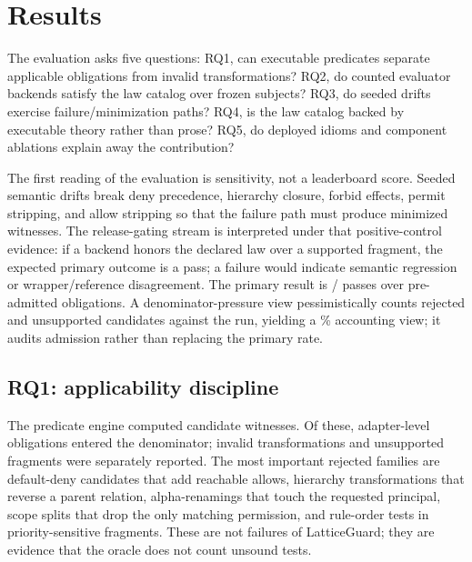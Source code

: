 \documentclass[10pt,conference]{IEEEtran}
\begin{document}
\section{Results}
\label{sec:evaluation}
The evaluation asks five questions: RQ1, can executable predicates separate applicable obligations from invalid transformations? RQ2, do counted evaluator backends satisfy the law catalog over frozen subjects? RQ3, do seeded drifts exercise failure/minimization paths? RQ4, is the law catalog backed by executable theory rather than prose? RQ5, do deployed idioms and component ablations explain away the contribution?

The first reading of the evaluation is sensitivity, not a leaderboard score.  Seeded semantic drifts break deny precedence, hierarchy closure, forbid effects, permit stripping, and allow stripping so that the failure path must produce minimized witnesses.  The release-gating stream is interpreted under that positive-control evidence: if a backend honors the declared law over a supported fragment, the expected primary outcome is a pass; a failure would indicate semantic regression or wrapper/reference disagreement.  The primary result is \LGPrimaryPasses{}/\LGPrimaryObligations{} passes over pre-admitted obligations.  A denominator-pressure view pessimistically counts rejected and unsupported candidates against the run, yielding a \LGAllCandidatePassRate{}\% accounting view; it audits admission rather than replacing the primary rate.

\subsection{RQ1: applicability discipline}
The predicate engine computed \LGPredicateWitnesses{} candidate witnesses.  Of these, \LGPrimaryObligations{} adapter-level obligations entered the denominator; \LGRejected{} invalid transformations and \LGUnsupported{} unsupported fragments were separately reported.  The most important rejected families are default-deny candidates that add reachable allows, hierarchy transformations that reverse a parent relation, alpha-renamings that touch the requested principal, scope splits that drop the only matching permission, and rule-order tests in priority-sensitive fragments.  These are not failures of LatticeGuard; they are evidence that the oracle does not count unsound tests.
\end{document}
